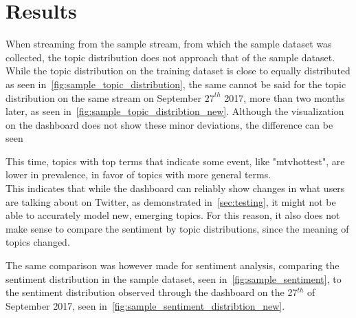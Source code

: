 \chapter{Results}
\label{ch:results}

When streaming from the sample stream, from which the sample dataset was collected,
the topic distribution does not approach that of the sample dataset.
While the topic distribution on the training dataset is close to equally distributed as seen in~\cref{fig:sample_topic_distribution},
the same cannot be said for the topic distribution on the same stream on September $27^{th}$ 2017, more than two months later,
as seen in~\cref{fig:sample_topic_distribtion_new}.
Although the visualization on the dashboard does not show these minor deviations,
the difference can be seen

This time, topics with top terms that indicate some event, like "mtvhottest", are lower in prevalence,
in favor of topics with more general terms.\\
This indicates that while the dashboard can reliably show changes in what users are talking about on Twitter,
as demonstrated in~\cref{sec:testing},
it might not be able to accurately model new, emerging topics.
For this reason, it also does not make sense to compare the sentiment by topic distributions,
since the meaning of topics changed.

The same comparison was however made for sentiment analysis, comparing the sentiment distribution in the sample dataset, seen in~\cref{fig:sample_sentiment},
to the sentiment distribution observed through the dashboard on the 27$^{th}$ of September 2017, seen in~\cref{fig:sample_sentiment_distribtion_new}.

